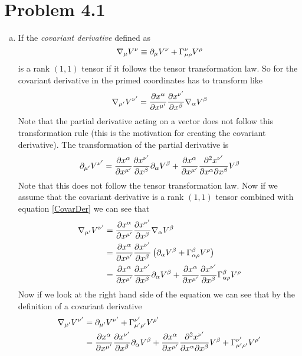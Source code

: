 \documentclass[11pt]{article}
\numberwithin{equation}{section}
\newcommand{\HWnum}{4}
\begin{document}


\section{Problem \HWnum.1}
\begin{enumerate}[(a)]
\item
If the \emph{covariant derivative} defined as
\begin{equation}
\bold\nabla_{\mu}V^{\nu} \equiv \partial_{\mu}V^{\nu} + \Gamma^{\nu}_{\mu\rho}V^{\rho}
\label{CovarDer}
\end{equation}
is a rank $(1,1)$ tensor if it follows the tensor transformation law. So for the covariant derivative in the primed coordinates has to transform like 
$$\bold\nabla_{\mu'}V^{\nu'} = \frac{\partial{x^{\alpha}}}{\partial{x^{\mu'}}}\frac{\partial{x^{\nu'}}}{\partial{x^{\beta}}}\bold\nabla_{\alpha}V^{\beta}$$
Note that the partial derivative acting on a vector does not follow this transformation rule (this is the motivation for creating the covariant derivative). The transformation of the partial derivative is
$$\partial_{\mu'}V^{\nu'} = \frac{\partial{x^{\alpha}}}{\partial{x^{\mu'}}}\frac{\partial{x^{\nu'}}}{\partial{x^{\beta}}}\partial_{\alpha}V^{\beta} + \frac{\partial{x^{\alpha}}}{\partial{x^{\mu'}}}\frac{\partial^2x^{\nu'}}{\partial x^{\alpha}\partial x^{\beta}}V^{\beta}$$
Note that this does not follow the tensor transformation law. Now if we assume that the covariant derivative is a rank $(1,1)$ tensor combined with equation \ref{CovarDer} we can see that
\begin{align*}
\bold\nabla_{\mu'}V^{\nu'} &= \frac{\partial{x^{\alpha}}}{\partial{x^{\mu'}}}\frac{\partial{x^{\nu'}}}{\partial{x^{\beta}}}\bold\nabla_{\alpha}V^{\beta}\\
&= \frac{\partial{x^{\alpha}}}{\partial{x^{\mu'}}}\frac{\partial{x^{\nu'}}}{\partial{x^{\beta}}}\left(\partial_{\alpha}V^{\beta} + \Gamma^{\beta}_{\alpha\rho}V^{\rho}\right)\\
&= \frac{\partial{x^{\alpha}}}{\partial{x^{\mu'}}}\frac{\partial{x^{\nu'}}}{\partial{x^{\beta}}}\partial_{\alpha}V^{\beta} + \frac{\partial{x^{\alpha}}}{\partial{x^{\mu'}}}\frac{\partial{x^{\nu'}}}{\partial{x^{\beta}}}\Gamma^{\beta}_{\alpha\rho}V^{\rho}
\end{align*}
Now if we look at the right hand side of the equation we can see that by the definition of a covariant derivative 
\begin{align*}
\grad_{\mu'}V^{\nu'} &= \partial_{\mu'}V^{\nu'} + \Gamma^{\nu'}_{\mu'\rho'}V^{\rho'}\\
&= \partiald{x^{\alpha}}{x^{\mu'}}\partiald{x^{\nu'}}{x^{\beta}}\partial_{\alpha}V^{\beta} + \partiald{x^{\alpha}}{x^{\mu'}}\frac{\partial^2x^{\nu'}}{\partial x^{\alpha}\partial x^{\beta}}V^{\beta} + \Gamma^{\nu'}_{\mu'\rho'}V^{\rho'}

\end{align*}
\end{enumerate}
\end{document}
